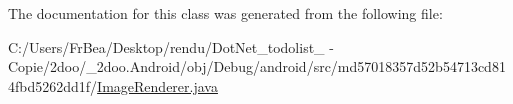 The documentation for this class was generated from the following file:\begin{CompactItemize}
\item 
C:/Users/FrBea/Desktop/rendu/DotNet\_\-todolist\_ - Copie/2doo/\_\-2doo.Android/obj/Debug/android/src/md57018357d52b54713cd814fbd5262dd1f/\hyperlink{md57018357d52b54713cd814fbd5262dd1f_2_image_renderer_8java}{ImageRenderer.java}\end{CompactItemize}
